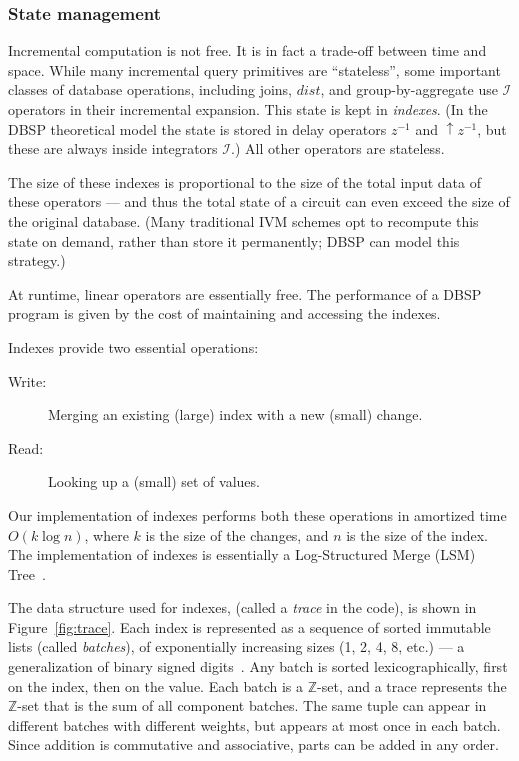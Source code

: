 \documentclass[twocolumn
]{svjour3}
\numberwithin{equation}{section}
\newcommand{\dbsp}{DBSP\xspace}
\newcommand{\zr}{$\Z$-set\xspace}
\newcommand{\Z}{\mathbb{Z}}  %
\newcommand{\zm}{\ensuremath{z^{-1}}} %
\newcommand{\I}{\mathcal{I}}  %
\newcommand{\I}{\mathit{I}}  %
\newcommand{\distinct}{\mathit{dist}}  %
\newcommand{\lift}[1]{{\uparrow}#1}
\begin{document}
\subsubsection{State management}\label{sec:state-management}

Incremental computation is not free.  It is in fact a trade-off
between time and space.  While many incremental query primitives are
``stateless'', some important classes of database operations,
including joins, $\distinct$, and group-by-aggregate use $\I$
operators in their incremental expansion.  This state is kept in
\emph{indexes}.  (In the \dbsp theoretical model the state is stored
in delay operators $\zm$ and $\lift{\zm}$, but these are always inside
integrators $\I$.)  All other operators are stateless.

The size of these indexes is proportional to the size of the total
input data of these operators --- and thus the total state of a
circuit can even exceed the size of the original database.  (Many
traditional IVM schemes opt to recompute this state on demand, rather
than store it permanently; \dbsp can model this strategy.)

At runtime, linear operators are essentially free.  The performance of
a \dbsp program is given by the cost of maintaining and
accessing the indexes.

Indexes provide two essential operations:
\begin{description}
\item[Write:] Merging an existing (large) index with a new (small) change.
\item[Read:] Looking up a (small) set of values.
\end{description}

Our implementation of indexes performs both these operations in
amortized time $O(k \log n)$, where $k$ is the size of the changes,
and $n$ is the size of the index.  The implementation of indexes is
essentially a Log-Structured Merge (LSM) Tree~\cite{oneil-ai96}.

The data structure used for indexes, (called a \emph{trace} in the
code), is shown in Figure~\ref{fig:trace}.  Each index is represented
as a sequence of sorted immutable lists (called \emph{batches}), of
exponentially increasing sizes (1, 2, 4, 8, etc.) --- a generalization
of binary signed digits~\cite{signed-digits}.  Any batch is sorted
lexicographically, first on the index, then on the value.  Each batch
is a \zr, and a trace represents the \zr that is the sum of all
component batches.  The same tuple can appear in different batches
with different weights, but appears at most once in each batch.  Since
addition is commutative and associative, parts can be added in any
order.
\end{document}
